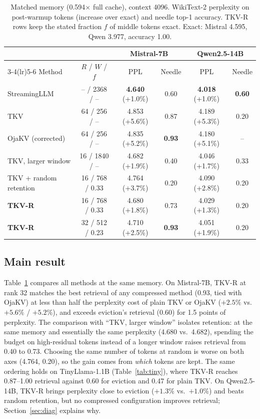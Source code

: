 \documentclass{article}
\begin{document}
\begin{table}[t]
\centering
\caption{Matched memory (0.594$\times$ full cache), context 4096. WikiText-2
perplexity on post-warmup tokens (increase over exact) and needle top-1
accuracy. TKV-R rows keep the stated fraction $f$ of middle tokens exact.
Exact: Mistral 4.595, Qwen 3.977, accuracy 1.00.}
\label{tab:main}
\small
\begin{tabular}{lccccc}
\toprule
& & \multicolumn{2}{c}{Mistral-7B} & \multicolumn{2}{c}{Qwen2.5-14B} \\
\cmidrule(lr){3-4}\cmidrule(lr){5-6}
Method & $R$ / $W$ / $f$ & PPL & Needle & PPL & Needle \\
\midrule
StreamingLLM          & -- / 2368 / --    & \textbf{4.640} (+1.0\%) & 0.60 & \textbf{4.018} (+1.0\%) & \textbf{0.60} \\
TKV                   & 64 / 256 / --     & 4.853 (+5.6\%) & 0.87 & 4.189 (+5.3\%) & 0.20 \\
OjaKV (corrected)     & 64 / 256 / --     & 4.835 (+5.2\%) & \textbf{0.93} & 4.180 (+5.1\%) & -- \\
TKV, larger window    & 16 / 1840 / --    & 4.682 (+1.9\%) & 0.40 & 4.046 (+1.7\%) & 0.33 \\
\midrule
TKV + random retention & 16 / 768 / 0.33  & 4.764 (+3.7\%) & 0.20 & 4.090 (+2.8\%) & 0.20 \\
\textbf{TKV-R}        & 16 / 768 / 0.33   & 4.680 (+1.8\%) & 0.73 & 4.029 (+1.3\%) & 0.20 \\
\textbf{TKV-R}        & 32 / 512 / 0.23   & 4.710 (+2.5\%) & \textbf{0.93} & 4.051 (+1.9\%) & 0.20 \\
\bottomrule
\end{tabular}
\end{table}

\subsection{Main result}

Table~\ref{tab:main} compares all methods at the same memory. On Mistral-7B,
TKV-R at rank 32 matches the best retrieval of any compressed method (0.93,
tied with OjaKV) at less than half the perplexity cost of plain TKV or OjaKV
($+2.5\%$ vs.\ $+5.6\%$ / $+5.2\%$), and exceeds eviction's retrieval (0.60) for
1.5 points of perplexity. The comparison with ``TKV, larger window'' isolates
retention: at the same memory and essentially the same perplexity (4.680 vs.\
4.682), spending the budget on high-residual tokens instead of a longer window
raises retrieval from 0.40 to 0.73. Choosing the same number of tokens at
random is worse on both axes (4.764, 0.20), so the gain comes from
\emph{which} tokens are kept. The same ordering holds on TinyLlama-1.1B
(Table~\ref{tab:tiny}), where TKV-R reaches 0.87--1.00 retrieval against 0.60
for eviction and 0.47 for plain TKV. On Qwen2.5-14B, TKV-R brings perplexity
close to eviction ($+1.3\%$ vs.\ $+1.0\%$) and beats random retention, but no
compressed configuration improves retrieval; Section~\ref{sec:diag} explains
why.
\end{document}
